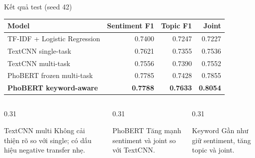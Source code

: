 \documentclass[aspectratio=169,11pt]{beamer}
\newcommand{\good}[1]{\textcolor{sgublue}{\textbf{#1}}}
\begin{document}
\begin{frame}{Kết quả test (seed 42)}
\small
\begin{center}
\begin{tabular}{@{}lrrr@{}}
\toprule
Model & Sentiment F1 & Topic F1 & Joint \\
\midrule
TF-IDF + Logistic Regression & 0.7400 & 0.7247 & 0.7227 \\
TextCNN single-task & 0.7621 & 0.7355 & 0.7536 \\
TextCNN multi-task & 0.7556 & 0.7390 & 0.7552 \\
PhoBERT frozen multi-task & 0.7785 & 0.7428 & 0.7855 \\
\good{PhoBERT keyword-aware} & \good{0.7788} & \good{0.7633} & \good{0.8054} \\
\bottomrule
\end{tabular}
\end{center}

\vspace{0.2cm}
\begin{columns}[T]
\begin{column}{0.31\textwidth}
\begin{block}{TextCNN multi}
Không cải thiện rõ so với single; có dấu hiệu negative transfer nhẹ.
\end{block}
\end{column}
\begin{column}{0.31\textwidth}
\begin{block}{PhoBERT}
Tăng mạnh sentiment và joint so với TextCNN.
\end{block}
\end{column}
\begin{column}{0.31\textwidth}
\begin{block}{Keyword}
Gần như giữ sentiment, tăng topic và joint.
\end{block}
\end{column}
\end{columns}
\end{frame}
\end{document}
